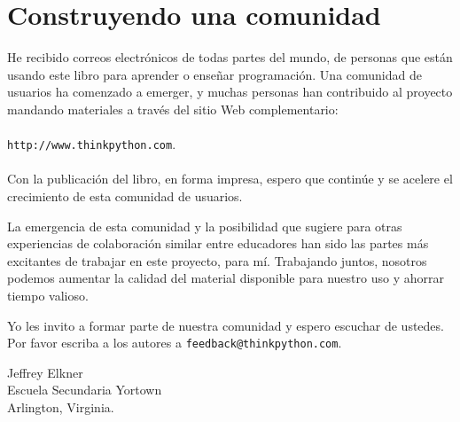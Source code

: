 \section*{Construyendo una comunidad}

He recibido correos electrónicos de todas partes del mundo, de personas que
están usando este libro 
para aprender o enseñar programación.  Una comunidad de usuarios ha comenzado a 
emerger, y muchas personas han contribuido al proyecto mandando materiales a
través del sitio Web complementario: \\ \\
  \texttt{http://www.thinkpython.com}.  \\ \\

Con la publicación del libro, en forma impresa, espero que continúe y se acelere 
el crecimiento de esta comunidad de usuarios.  

La emergencia de esta comunidad y la posibilidad que sugiere para otras
experiencias de colaboración similar entre educadores han sido las partes más 
excitantes de trabajar en este proyecto, para mí.  Trabajando juntos, nosotros podemos aumentar
la calidad del material disponible para nuestro uso y ahorrar tiempo valioso.  

Yo les invito a formar parte de nuestra comunidad y espero escuchar de ustedes.  
Por favor escriba a los autores a \texttt{feedback@thinkpython.com}.

\vspace{0.25in}
\begin{flushleft}
Jeffrey Elkner\\
Escuela Secundaria Yortown\\
Arlington, Virginia.\\
\end{flushleft}
